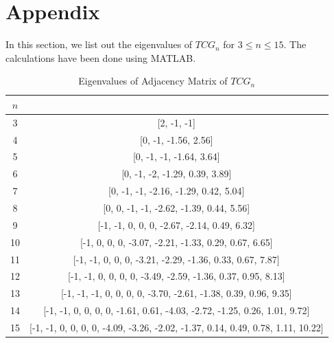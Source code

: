 \documentclass[12pt]{article}
\begin{document}
	
	\section{Appendix}
	\label{appendix}
	In this section, we list out the eigenvalues of $TCG_n$ for $3\le n\le 15.$
	The calculations have been done using MATLAB.
	\begin{table}[H]
		\centering
		\begin{tabular}{c|c}
			$n$  &  \text{Adjacency Spectrum}\\
			\hline
			3 & [2, -1, -1]
			\\
			\hline
			4 & [0, -1, -1.56, 2.56]
			\\
			\hline
			5 & [0, -1, -1, -1.64, 3.64]
			\\
			\hline
			6 & [0, -1, -2, -1.29, 0.39, 3.89]
			\\
			\hline
			7 & [0, -1, -1, -2.16, -1.29, 0.42, 5.04]
			\\
			\hline
			8 & [0, 0, -1, -1, -2.62, -1.39, 0.44, 5.56]
			\\
			\hline
			9 & [-1, -1, 0, 0, 0, -2.67, -2.14, 0.49, 6.32]
			\\
			\hline
			10 & [-1, 0, 0, 0, -3.07, -2.21, -1.33, 0.29, 0.67, 6.65]\\
			\hline
			11 & [-1, -1, 0, 0, 0, -3.21, -2.29, -1.36, 0.33, 0.67, 7.87]\\
			\hline
			12 & [-1, -1, 0, 0, 0, 0, -3.49, -2.59, -1.36, 0.37, 0.95, 8.13]\\
			\hline
			13 & [-1, -1, -1, 0, 0, 0, 0, -3.70, -2.61, -1.38, 0.39, 0.96, 9.35]\\
			\hline
			14 & [-1, -1, 0, 0, 0, 0, -1.61, 0.61, -4.03, -2.72, -1.25, 0.26, 1.01, 9.72]
			\\
			\hline
			15 & [-1, -1, 0, 0, 0, 0, -4.09, -3.26, -2.02, -1.37, 0.14, 0.49, 0.78, 1.11, 10.22]
		\end{tabular}
		\caption{Eigenvalues of Adjacency Matrix of $TCG_n$}
		\label{tab:my_label}
	\end{table}
	
	
	
\end{document}
